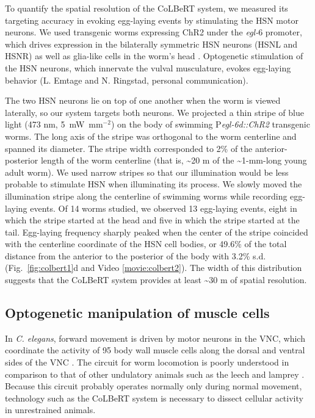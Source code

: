 To quantify the spatial resolution of the CoLBeRT system, we measured its targeting accuracy in evoking egg-laying events by stimulating the HSN motor neurons. We used transgenic worms expressing ChR2 under the \textit{egl-$6$} promoter, which drives expression in the bilaterally symmetric HSN neurons (HSNL and HSNR) as well as glia-like cells in the worm's head  \citep{ringstad_fmrfamide_2008}. Optogenetic stimulation of the HSN neurons, which innervate the vulval musculature, evokes egg-laying behavior (L. Emtage and N. Ringstad, personal communication).

The two HSN neurons lie on top of one another when the worm is viewed laterally, so our system targets both neurons. We projected a thin stripe of blue light (473 nm, 5~mW~mm$^{-2}$) on the body of swimming P\textit{egl-6d::ChR2} transgenic worms. The long axis of the stripe was orthogonal to the worm centerline and spanned its diameter. The stripe width corresponded to 2\% of the anterior-posterior length of the worm centerline (that is, \textasciitilde20 \textmu m of the \textasciitilde1-mm-long young adult worm). We used narrow stripes so that our illumination would be less probable to stimulate HSN when illuminating its process. We slowly moved the illumination stripe along the centerline of swimming worms while recording egg-laying events. Of 14 worms studied, we observed 13 egg-laying events, eight in which the stripe started at the head and five in which the stripe started at the tail. Egg-laying frequency sharply peaked when the center of the stripe coincided with the centerline coordinate of the HSN cell bodies, or 49.6\% of the total distance from the anterior to the posterior of the body with 3.2\% s.d. (Fig.~\ref{fig:colbert1}d and Video \ref{movie:colbert2}). The width of this distribution suggests that the CoLBeRT system provides at least \textasciitilde30 \textmu m of spatial resolution.


\subsection{Optogenetic manipulation of muscle cells}
In \textit{C. elegans}, forward movement is driven by motor neurons in the VNC, which coordinate the activity of 95 body wall muscle cells along the dorsal and ventral sides of the VNC \citep{von_stetina_motor_2006}. The circuit for worm locomotion is poorly understood in comparison to that of other undulatory animals such as the leech and lamprey \citep{marder_principles_1996, bryden_neural_2008, karbowski_systems_2008}. Because this circuit probably operates normally only during normal movement, technology such as the CoLBeRT system is necessary to dissect cellular activity in unrestrained animals.

